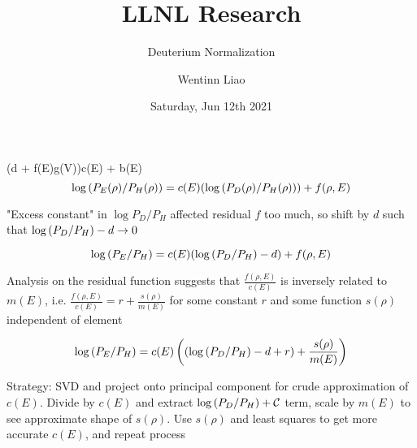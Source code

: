 \documentclass[10pt]{scrartcl}
\title{LLNL Research}
\subtitle{Deuterium Normalization}
\author{Wentinn Liao}
\date{Saturday, Jun 12th 2021}
\begin{document}
	\maketitle
	(d + f(E)g(V))c(E) + b(E)
	\[
		\log{\displaystyle\left( P_E(\rho) / P_H(\rho) \right)} = c(E)(\log{\displaystyle\left( P_D(\rho) / P_H(\rho) \right)}) + f(\rho, E)
	\]

	"Excess constant" in $\log{P_D / P_H}$ affected residual $f$ too much, so shift by $d$ such that $\log{\displaystyle\left( P_D / P_H \right)} - d \rightarrow 0$
	
	\[
		\log{\displaystyle\left( P_E / P_H \right)} = c(E)(\log{\displaystyle\left( P_D / P_H \right)} - d) + f(\rho, E)
	\]
	
	Analysis on the residual function suggests that $\frac{f(\rho, E)}{c(E)}$ is inversely related to $m(E)$, i.e. $\frac{f(\rho, E)}{c(E)} = r + \frac{s(\rho)}{m(E)}$ for some constant $r$ and some function $s(\rho)$ independent of element
	
	\[
		\log{\displaystyle\left( P_E / P_H \right)} = c(E)\displaystyle\left( (\log{\displaystyle\left( P_D / P_H \right)} - d + r) + \frac{s(\rho)}{m(E)} \right)
	\]
	
	Strategy: SVD and project onto principal component for crude approximation of $c(E)$. Divide by $c(E)$ and extract $\log{\displaystyle\left( P_D / P_H \right)} + \mathcal{ C }$ term, scale by $m(E)$ to see approximate shape of $s(\rho)$. Use $s(\rho)$ and least squares to get more accurate $c(E)$, and repeat process
\end{document}
